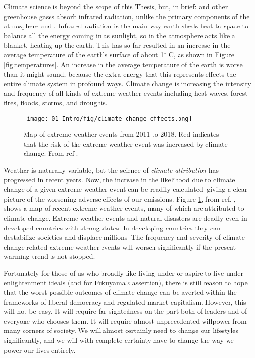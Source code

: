 Climate science is beyond the scope of this Thesis, but, in brief:  and other greenhouse gases absorb infrared radiation, unlike the primary components of the atmosphere  and . Infrared radiation is the main way earth sheds heat to space to balance all the energy coming in as sunlight, so  in the atmosphere acts like a blanket, heating up the earth. This has so far resulted in an increase in the average temperature of the earth's surface of about 1$^\circ$ C, as shown in Figure \ref{fig:temperatures}. An increase in the average temperature of the earth is worse than it might sound, because the extra energy that this represents effects the entire climate system in profound ways. Climate change is increasing the intensity and frequency of all kinds of extreme weather events including heat waves, forest fires, floods, storms, and droughts\cite{IPCC2014, CarbonBrief}. 
\begin{figure}[ht!]
	\centering
	\texttt{[image: 01\_Intro/fig/climate\_change\_effects.png]}
	\caption{Map of extreme weather events from 2011 to 2018. Red indicates that the risk of the extreme weather event was increased by climate change. From %
	ref .
}
	\label{fig:attribution}
\end{figure}
Weather is naturally variable, but the science of \textit{climate attribution} has progressed in recent years. Now, the increase in the likelihood due to climate change of a given extreme weather event can be readily calculated, giving a clear picture of the worsening adverse effects of our emissions\cite{Schiermeier2018}. Figure \ref{fig:attribution}, from ref. , shows a map of recent extreme weather events, many of which are attributed to climate change. Extreme weather events and natural disasters are deadly even in developed countries with strong states. In developing countries they can destabilize societies and displace millions\cite{UNHCR2019}. The frequency and severity of climate-change-related extreme weather events will worsen significantly if the present warming trend is not stopped\cite{IPCC2018_SPM}. 

Fortunately for those of us who broadly like living under or aspire to live under enlightenment ideals (and for Fukuyama's assertion), there is still reason to hope that the worst possible outcomes of climate change can be averted within the frameworks of liberal democracy and regulated market capitalism. However, this will not be easy. It will require far-sightedness on the part both of leaders and of everyone who chooses them. It will require almost unprecedented willpower from many corners of society. We will almost certainly need to change our lifestyles significantly, and we will with complete certainty have to change the way we power our lives entirely. 


